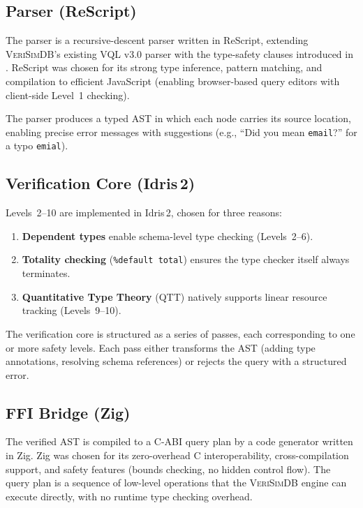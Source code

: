 \documentclass[11pt,a4paper]{article}
\newcommand{\VeriSimDB}{\textsc{VeriSimDB}}
\begin{document}
\subsection{Parser (ReScript)}

The parser is a recursive-descent parser written in ReScript, extending
\VeriSimDB{}'s existing VQL v3.0 parser with the type-safety clauses
introduced in .  ReScript was chosen for its strong
type inference, pattern matching, and compilation to efficient
JavaScript (enabling browser-based query editors with client-side
Level~1 checking).

The parser produces a typed AST in which each node carries its source
location, enabling precise error messages with suggestions (e.g.,
``Did you mean \texttt{email}?'' for a typo \texttt{emial}).

\subsection{Verification Core (Idris\,2)}

Levels~2--10 are implemented in Idris\,2, chosen for three reasons:
\begin{enumerate}[nosep]
  \item \textbf{Dependent types} enable schema-level type checking
    (Levels~2--6).
  \item \textbf{Totality checking} (\texttt{\%default total}) ensures
    the type checker itself always terminates.
  \item \textbf{Quantitative Type Theory} (QTT) natively supports
    linear resource tracking (Levels~9--10).
\end{enumerate}

The verification core is structured as a series of passes, each
corresponding to one or more safety levels.  Each pass either
transforms the AST (adding type annotations, resolving schema
references) or rejects the query with a structured error.

\subsection{FFI Bridge (Zig)}

The verified AST is compiled to a C-ABI query plan by a code generator
written in Zig.  Zig was chosen for its zero-overhead C interoperability,
cross-compilation support, and safety features (bounds checking,
no hidden control flow).  The query plan is a sequence of low-level
operations that the \VeriSimDB{} engine can execute directly, with
no runtime type checking overhead.
\end{document}
